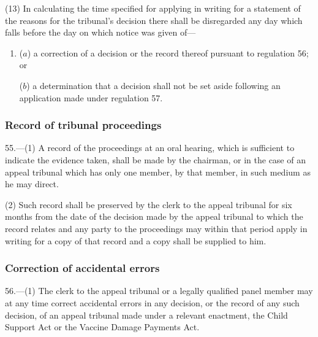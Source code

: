 \documentclass[12pt,a4paper]{article}
\begin{document}
(13) In calculating the time specified for applying in writing for a statement of the reasons for the tribunal’s decision there shall be disregarded any day which falls before the day on which notice was given of—
\begin{enumerate}\item[]
($a$) a correction of a decision or the record thereof pursuant to regulation 56; or

($b$) a determination that a decision shall not be set aside following an application made under regulation 57.
\end{enumerate}


\subsubsection[55. Record of tribunal proceedings]{Record of tribunal proceedings}

55.—(1) A record of the proceedings at an oral hearing, which is sufficient to indicate the evidence taken, shall be made by the chairman, or in the case of an appeal tribunal which has only one member, by that member, in such medium as he may direct.

(2) Such record shall be preserved by the clerk to the appeal tribunal for six months from the date of the decision made by the appeal tribunal to which the record relates and any party to the proceedings may within that period apply in writing for a copy of that record and a copy shall be supplied to him.

\subsubsection[56. Correction of accidental errors]{Correction of accidental errors}

56.—(1) The clerk to the appeal tribunal
or a legally qualified panel member  %
may at any time correct accidental errors in any decision, or the record of any such decision, of an appeal tribunal made under a relevant enactment, the Child Support Act or the Vaccine Damage Payments Act.
\end{document}
